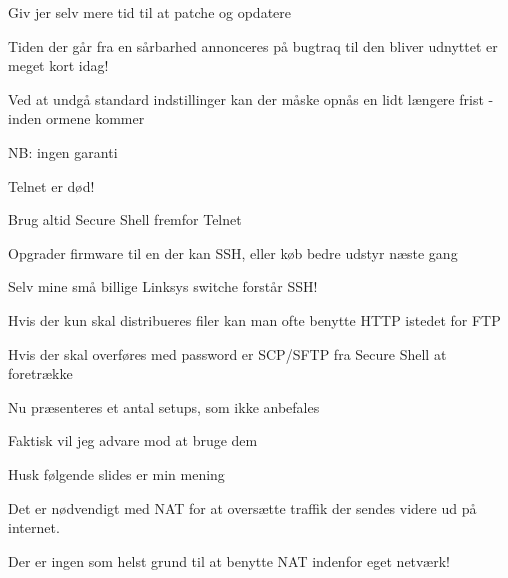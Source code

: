 \documentclass[Screen16to9,17pt]{foils}
\begin{document}

\begin{list1}
\item Giv jer selv mere tid til at patche og opdatere
\item Tiden der går fra en sårbarhed annonceres på bugtraq til den bliver
       udnyttet er meget kort idag!
\item Ved at undgå standard indstillinger kan der
       måske opnås en lidt længere frist - inden ormene kommer
\item NB: ingen garanti
\end{list1}




\begin{list1}
\item Telnet er død!
\item Brug altid Secure Shell fremfor Telnet
\item Opgrader firmware til en der kan SSH, eller køb bedre udstyr næste gang
\item Selv mine små billige Linksys switche forstår SSH!
\end{list1}


\begin{list1}
\item Hvis der kun skal distribueres filer kan man ofte benytte HTTP istedet for FTP
\item Hvis der skal overføres med password er SCP/SFTP fra Secure Shell at foretrække
\end{list1}



\begin{list1}
\item Nu præsenteres et antal setups, som ikke anbefales
\item Faktisk vil jeg advare mod at bruge dem
\item Husk følgende slides er min mening
\end{list1}



\begin{list1}
\item Det er nødvendigt med NAT for at oversætte traffik der sendes videre
ud på internet.
\vskip 1cm
\item Der er ingen som helst grund til at benytte NAT indenfor eget netværk!
\end{list1}
\end{document}
